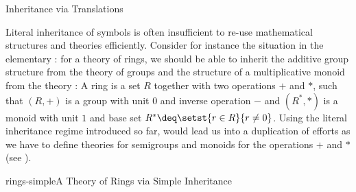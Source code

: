 \begin{omgroup}[id=complex-theories,short=Complex Theories,
                            creators=miko,contributors=frabe]
\begin{omgroup}[id=morphisms]{Inheritance via Translations}
\begin{module}[id=morphisms]
Literal inheritance of symbols is often insufficient to re-use mathematical structures and
theories efficiently. Consider for instance the situation in the elementary
{}: for a theory of rings, we should be able to inherit the
additive group structure from the theory {} of groups and the structure of
a multiplicative monoid from the theory {}: A ring is a set $R$ together
with two operations $+$ and $*$, such that $(R,+)$ is a group with unit $0$ and inverse
operation $-$ and $(R^*,*)$ is a monoid with unit $1$ and base set $R^*\deq\setst{r\in
  R}{r\ne 0}$.  Using the literal inheritance regime introduced so far, would lead us into
a duplication of efforts as we have to define theories for semigroups and monoids for the
operations $+$ and $*$ (see {}).
\begin{myfig}{rings-simple}{A Theory of Rings via Simple Inheritance}
\end{myfig}
\end{module}
\end{omgroup}
\end{omgroup}
